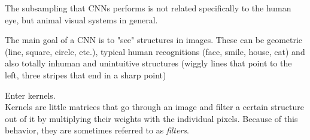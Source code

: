 The subsampling that CNNs performs is not related specifically to the human eye, but animal visual systems in general.  \cite{MasakazuMatsugu2003}  

The main goal of a CNN is to "see" structures in images.  
These can be geometric (line, square, circle, etc.),  
typical human recognitions (face, smile, house, cat)  
and also totally inhuman and unintuitive structures (wiggly lines that point to the left, three stripes that end in a sharp point)

Enter kernels.  \\
Kernels are little matrices that go through an image and filter a certain structure out of it by multiplying their weights with the individual pixels. Because of this behavior, they are sometimes referred to as \emph{filters}. 

